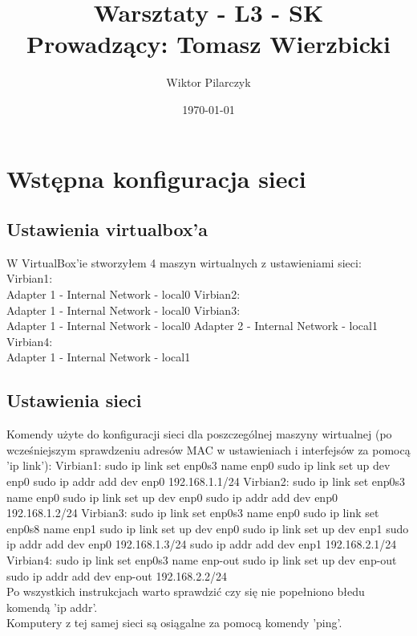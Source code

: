 \documentclass{article}
\author{Wiktor Pilarczyk}
\title{Warsztaty - L3 - SK\\\large{Prowadzący: Tomasz Wierzbicki}}
\date{\today}
\begin{document}
\maketitle
\section{Wstępna konfiguracja sieci}
\subsection{Ustawienia virtualbox'a}
W VirtualBox'ie stworzyłem 4 maszyn wirtualnych z ustawieniami sieci:\\
\tabto{0.4cm}Virbian1:\\
\tabto{0.8cm}    Adapter 1 - Internal Network - local0
\tabto{0.4cm}Virbian2:\\
\tabto{0.8cm}    Adapter 1 - Internal Network - local0
\tabto{0.4cm}Virbian3:\\
\tabto{0.8cm}    Adapter 1 - Internal Network - local0
\tabto{0.8cm}    Adapter 2 - Internal Network - local1
\tabto{0.4cm}Virbian4:\\
\tabto{0.8cm}    Adapter 1 - Internal Network - local1
\newpage
\subsection{Ustawienia sieci}
Komendy użyte do konfiguracji sieci dla poszczególnej maszyny wirtualnej (po wcześniejszym sprawdzeniu adresów MAC w ustawieniach i interfejsów za pomocą 'ip link'):
\tabto{0.4cm}Virbian1:
\tabto{0.8cm}    sudo ip link set enp0s3 name enp0
\tabto{0.8cm}    sudo ip link set up dev enp0
\tabto{0.8cm}    sudo ip addr add dev enp0 192.168.1.1/24
\tabto{0.4cm}Virbian2:
\tabto{0.8cm}    sudo ip link set enp0s3 name enp0
\tabto{0.8cm}    sudo ip link set up dev enp0
\tabto{0.8cm}    sudo ip addr add dev enp0 192.168.1.2/24
\tabto{0.4cm}Virbian3:
\tabto{0.8cm}    sudo ip link set enp0s3 name enp0
\tabto{0.8cm}    sudo ip link set enp0s8 name enp1
\tabto{0.8cm}    sudo ip link set up dev enp0
\tabto{0.8cm}    sudo ip link set up dev enp1
\tabto{0.8cm}    sudo ip addr add dev enp0 192.168.1.3/24
\tabto{0.8cm}    sudo ip addr add dev enp1 192.168.2.1/24
\tabto{0.4cm}Virbian4:
\tabto{0.8cm}    sudo ip link set enp0s3 name enp-out
\tabto{0.8cm}    sudo ip link set up dev enp-out
\tabto{0.8cm}    sudo ip addr add dev enp-out 192.168.2.2/24
\\
Po wszystkich instrukcjach warto sprawdzić czy się nie popełniono błedu komendą 'ip addr'.
\\
Komputery z tej samej sieci są osiągalne za pomocą komendy 'ping'.
\end{document}
